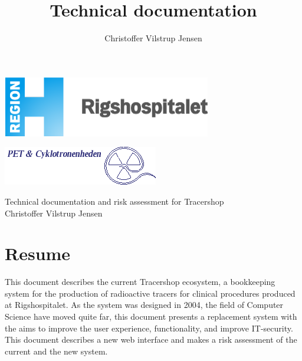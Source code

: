 \documentclass{article}
\author{Christoffer Vilstrup Jensen}
\title{Technical documentation}
\begin{document}
\begin{titlepage}
  \begin{minipage}{0.48\linewidth}
    \includegraphics[width=0.6\linewidth]{logo.png}
  \end{minipage}
  \begin{minipage}{0.48\linewidth}
    \raggedleft
      \includegraphics[width=0.6\linewidth]{petlogo_small.png}
  \end{minipage}
  \vspace{1cm}
  \begin{center}
    \Huge Technical documentation and risk assessment for Tracershop \\
    \vspace{1cm}
    \Large Christoffer Vilstrup Jensen\\
  \end{center}
\end{titlepage}

\section*{Resume}
This document describes the current Tracershop ecosystem,
a bookkeeping system for the production of radioactive tracers for clinical procedures produced at Rigshospitalet.
As the system was designed in 2004, the field of Computer Science have moved quite far, this document presents a replacement system with the aims
to improve the user experience, functionality, and improve IT-security.
This document describes a new web interface and makes a risk assessment of the current and the new system.
\end{document}

